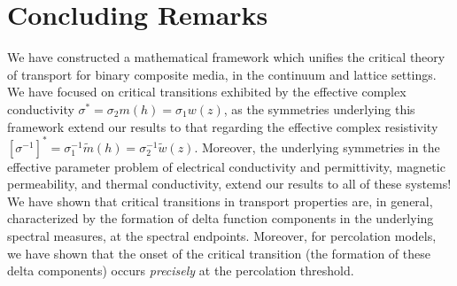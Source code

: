 \documentclass[english,12pt,jmp,graphicx]{revtex4-1}
\begin{document}
%

\section{Concluding Remarks}
%
We have constructed a mathematical framework which unifies the critical
theory of transport for binary composite media, in the continuum and
lattice settings. We have focused on critical transitions exhibited by
the effective complex conductivity $\sigma^*=\sigma_2m(h)=\sigma_1w(z)$, as the
symmetries underlying this framework extend our results to that
regarding the effective complex resistivity
$[\sigma^{-1}]^*=\sigma_1^{-1}\tilde{m}(h)=\sigma_2^{-1}\tilde{w}(z)$. Moreover, the
underlying symmetries in the effective parameter problem of electrical
conductivity and permittivity, magnetic permeability, and thermal
conductivity, extend our results to all of these systems! We have
shown that critical transitions in transport properties are, in
general, characterized by the formation of delta function components
in the underlying spectral measures, at the spectral
endpoints. Moreover, for percolation models, we have shown that the
onset of the critical transition (the formation of these delta
components) occurs \emph{precisely} at the percolation threshold.       
\end{document}
